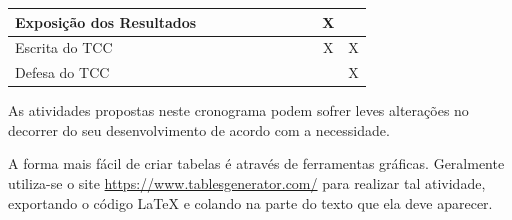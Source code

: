 \begin{table}[!htb]
\begin{tabular}{|l|c|c|c|c|c|c|c|c|c|c|}
Exposição dos Resultados                   &              &              &              &              &              &                &                   &               & X            &              \\ \hline
Escrita do TCC                             &              &              &              &              &              &                &                   &               & X            & X            \\ \hline
Defesa do TCC                              &              &              &              &              &              &                &                   &               &              & X            \\ \hline
\end{tabular}
\vspace{6pt}
\end{table}

As atividades propostas neste cronograma podem sofrer leves alterações no decorrer do seu desenvolvimento de acordo com a necessidade.

A forma mais fácil de criar tabelas é através de ferramentas gráficas. Geralmente utiliza-se o site \url{https://www.tablesgenerator.com/} para realizar tal atividade, exportando o código LaTeX e colando na parte do texto que ela deve aparecer.